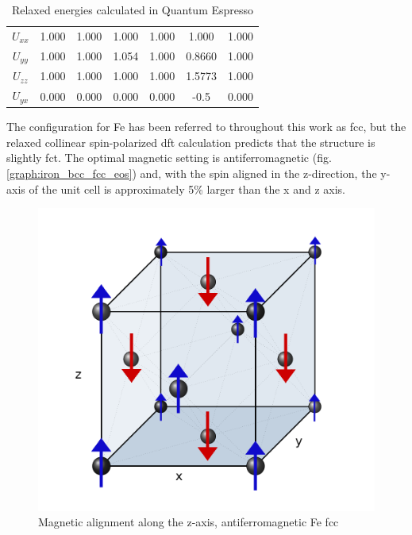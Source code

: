 \begin{landscape}
\begin{table}[h]
\begin{center}
\begin{tabular}{c c c c c c c}
$U_{xx}$                   & 1.000           & 1.000            & 1.000              & 1.000              & 1.000            & 1.000           \\
$U_{yy}$                   & 1.000           & 1.000            & 1.054              & 1.000               & 0.8660            & 1.000          \\
$U_{zz}$                   & 1.000           & 1.000            & 1.000              & 1.000                & 1.5773            & 1.000         \\
$U_{yx}$                   & 0.000           & 0.000            & 0.000              & 0.000                & -0.5            & 0.000         \\
\hline\hline
\end{tabular}
\end{center}
\caption{Relaxed energies calculated in Quantum Espresso}
\label{table:relaxedenergies}
\end{table}

\end{landscape}
\clearpage


The configuration for Fe has been referred to throughout this work as \acrshort{fcc}, but the relaxed collinear spin-polarized \acrshort{dft} calculation predicts that the structure is slightly \acrfull{fct}.  The optimal magnetic setting is antiferromagnetic (fig. \ref{graph:iron_bcc_fcc_eos}) and, with the spin aligned in the z-direction, the y-axis of the unit cell is approximately 5\% larger than the x and z axis.

\begin{figure}[ht] 
  \centering
  \includegraphics[width=.7\linewidth]{chapters/potentials_fe_pd_ru/images/fe-austenitic-mag.png} 
  \caption{Magnetic alignment along the z-axis, antiferromagnetic Fe fcc}  
  \label{fig:ironfccantiferromagnetic}
\end{figure}

